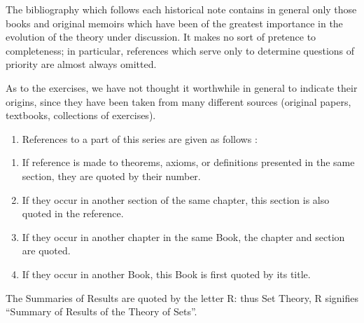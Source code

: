 The bibliography which follows each historical note contains in general only those books and original memoirs which have been of the greatest importance in the evolution of the theory under discussion. It makes no sort of pretence to completeness; in particular, references which serve only to determine questions of priority are almost always omitted.

As to the exercises, we have not thought it worthwhile in general to indicate their origins, since they have been taken from many different sources (original papers, textbooks, collections of exercises).

\begin{enumerate}
\def\labelenumi{\arabic{enumi}.}
\setcounter{enumi}{10}
\tightlist
\item
  References to a part of this series are given as follows :
\end{enumerate}

\begin{enumerate}
\def\labelenumi{\alph{enumi})}
\item
  If reference is made to theorems, axioms, or definitions presented in the same section, they are quoted by their number.
\item
  If they occur in another section of the same chapter, this section is also quoted in the reference.
\item
  If they occur in another chapter in the same Book, the chapter and section are quoted.
\item
  If they occur in another Book, this Book is first quoted by its title.
\end{enumerate}

The Summaries of Results are quoted by the letter R: thus Set Theory, R signifies ``Summary of Results of the Theory of Sets''.

